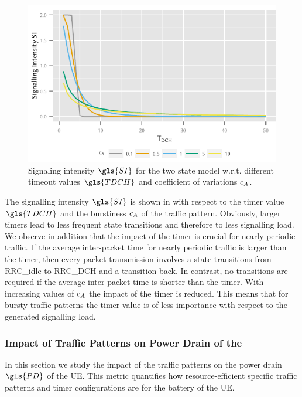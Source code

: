 \begin{figure}
	\centering
	\includegraphics{network/performance_model/numerical_examples/figures/2state_tdch_si}
	\caption{Signaling intensity \(\gls{SI}\) for the two state model w.r.t. different timeout values \(\gls{TDCH}\) and coefficient of variations \(c_{A}\).}
	\label{fig:network:performance_model:numerical_examples:validations:analytic_vs_simulation:2state_tdch_si}
\end{figure}


The signalling intensity \(\gls{SI}\) is shown in  with respect to the timer value \(\gls{TDCH}\) and the burstiness \(c_{A}\) of the traffic pattern.
Obviously, larger timers lead to less frequent state transitions and therefore to less signalling load.
We observe in addition that the impact of the timer is crucial for nearly periodic traffic.
If the average inter-packet time for nearly periodic traffic is larger than the timer, then every packet transmission involves a state transitions from \gls{RRC_idle} to \gls{RRC_DCH} and a transition back.
In contrast, no transitions are required if the average inter-packet time is shorter than the timer.
With increasing values of \(c_{A}\) the impact of the timer is reduced.
This means that for bursty traffic patterns the timer value is of less importance with respect to the generated signalling load.

\subsubsection*{Impact of Traffic Patterns on Power Drain of the }\label{sec:network:performance_model:power_drain}
In this section we study the impact of the traffic patterns on the power drain \(\gls{PD}\) of the \gls{UE}.
This metric quantifies how resource-efficient specific traffic patterns and timer configurations are for the battery of the \gls{UE}.

